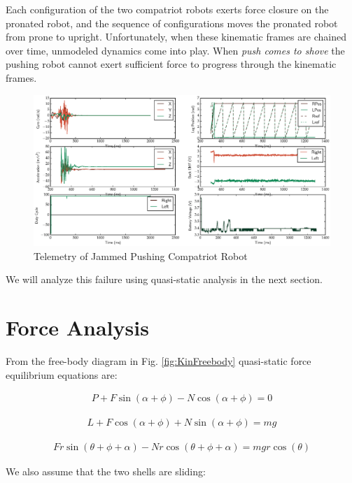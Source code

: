 \documentclass[letterpaper]{report}
\begin{document}
Each configuration of the two compatriot robots exerts force closure on the pronated robot, and the sequence of configurations moves the pronated robot from prone to upright.
Unfortunately, when these kinematic frames are chained over time, unmodeled dynamics come into play.
When \textit{push comes to shove} the pushing robot cannot exert sufficient force to progress through the kinematic frames.

\begin{figure}[ht]
  \centering
  \includegraphics[width=\textwidth]{JammedTelemetry.eps}
  \caption{\label{fig:JammedKinFlipTelemetry}Telemetry of Jammed Pushing Compatriot Robot}
\end{figure}

We will analyze this failure using quasi-static analysis in the next section.

\section{Force Analysis}
From the free-body diagram in Fig. \ref{fig:KinFreebody} quasi-static force equilibrium equations are:

\begin{align}
  P + F \sin(\alpha + \phi) - N \cos(\alpha + \phi) = 0
  \label{eq:KinQSX}
\end{align}

\begin{align}
  L + F \cos(\alpha + \phi) + N \sin(\alpha + \phi) = mg
  \label{eq:KinQSY}
\end{align}

\begin{align}
  F r \sin(\theta + \phi + \alpha) - N r \cos(\theta + \phi + \alpha) = mg r \cos(\theta)
  \label{eq:KinTorque}
\end{align}

We also assume that the two shells are sliding:
\end{document}

